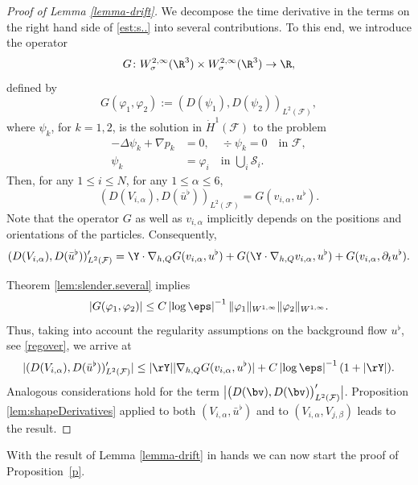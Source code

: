 \begin{proof}[Proof of Lemma \ref{lemma-drift}]
We decompose the time derivative in the terms on the right hand side of \eqref{est:s..} into several contributions.
To this end, we introduce the operator
\[
G \colon W^{2,\infty}_\sigma(\R^3) \times W^{2,\infty}_\sigma(\R^3) \to \R,\]
defined by
\begin{equation*}
G(\varphi_1,\varphi_2) := (D (\psi_1),D (\psi_2))_{L^2(\mathcal F)},
\end{equation*}
where $\psi_k$, for $k=1,2$, is the solution in $ \dot H^1(\mathcal F)$ to
the problem
\begin{equation*}
\begin{aligned}
- \Delta \psi_k + \nabla p_k &= 0, \quad \div \psi_k = 0 \quad \text{in } \mathcal F, \\
\psi_k &= \varphi_i \quad \text{in } \bigcup_i \mathcal S_i.
\end{aligned}
\end{equation*}
Then, for any $1\leq i \leq N$, for any $1 \leq \alpha \leq 6$,
\[
(D (V_{i,\alpha}), D(\bar u^\flat))_{L^2(\mathcal F)} = G(v_{i,\alpha},u^\flat).\]
Note that the operator $G$ as well as $v_{i,\alpha}$ implicitly depends on the positions and orientations of the particles. Consequently,
\begin{equation*}
(D (V_{i,\alpha}), D(\bar u^\flat))'_{L^2(\mathcal F)} = \Y \cdot \nabla_{h,Q} G(v_{i,\alpha},u^\flat) + G(\Y \cdot \nabla_{h,Q} v_{i,\alpha}, u^\flat) + G(v_{i,\alpha}, \partial_t u^\flat).
\end{equation*}

Theorem \ref{lem:slender.several} implies
\begin{equation*}
|G(\varphi_1,\varphi_2)| \leq C \left|\log \eps\right|^{-1} \|\varphi_1\|_{W^{1,\infty} } \|\varphi_2\|_{W^{1,\infty}}.
\end{equation*}
Thus, taking into account the regularity assumptions on the background flow $u^\flat$, see \eqref{regover}, we arrive at
\begin{equation*}
|(D (V_{i,\alpha}), D (\bar u^\flat))'_{L^2(\mathcal F)}| \leq |\rY| |\nabla_{h,Q} G(v_{i,\alpha},u^\flat)| + C \left|\log \eps\right|^{-1} (1+ |\rY|).
\end{equation*}
Analogous considerations hold for the term ${\big|\big(D (\bv),
D (\bv)\big)_{L^2(\mathcal F)}'\big|}$. Proposition \ref{lem:shapeDerivatives} applied to both
$(V_{i,\alpha},\bar u^\flat)$ and to $(V_{i,\alpha},V_{j,\beta})$ leads to the result.
\end{proof}

With the result of Lemma \ref{lemma-drift} in hands we can now start the proof of Proposition~\ref{p}.

